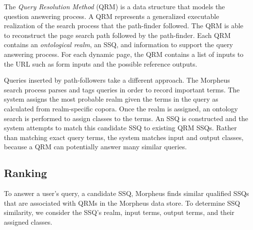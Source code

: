 \begin{table}[h]
	\caption{Example SSQ Model.}
	\label{tab:ssq_example}
\end{table}


The \emph{Query Resolution Method} (QRM) is a data structure that models the question answering process. A QRM represents a generalized executable realization of the search process that the path-finder followed. The QRM is able to reconstruct the page search path followed by the path-finder. Each QRM contains an \emph{ontological realm}, an SSQ, and information to support the query answering process. For each dynamic page, the QRM contains a list of inputs to the URL such as form inputs and the possible reference outputs.



Queries inserted by path-followers take a different approach. The Morpheus search process parses and tags queries in order to record important terms. The system assigns the most probable realm given the terms in the query as calculated from realm-specific copora. Once the realm is assigned, an ontology search is performed to assign classes to the terms. An SSQ is constructed and the system attempts to match this candidate SSQ to existing QRM SSQs. Rather than matching exact query terms, the system matches input and output classes, because a QRM can potentially answer many similar queries.


\subsection{Ranking} 
\label{sec:qrm_ranking}

To answer a user's query, a candidate SSQ, Morpheus finds similar qualified SSQs that are associated with QRMs in the Morpheus data store.  To determine SSQ similarity, we consider the SSQ's realm, input terms, output terms, and their assigned classes. 

